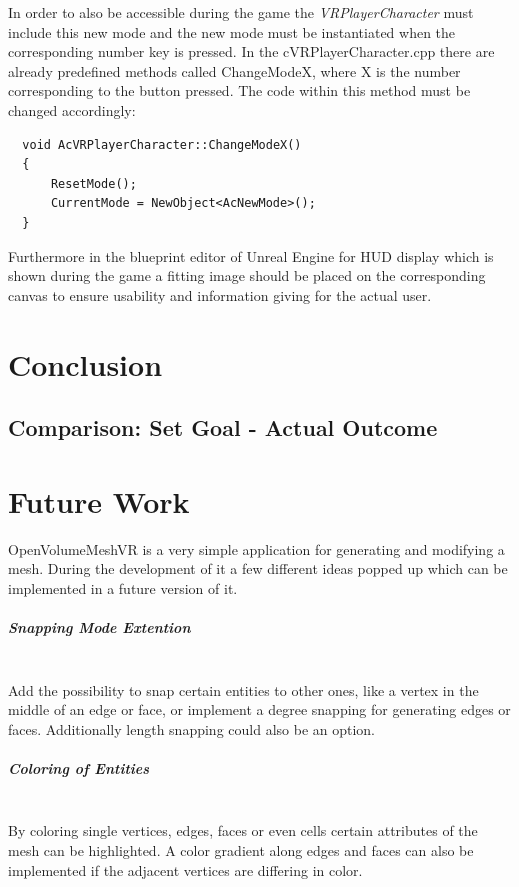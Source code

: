 \documentclass{report}
\begin{document}
		In order to also be accessible during the game the \textit{VRPlayerCharacter} must include this new mode and the new mode must be instantiated when the corresponding number key is pressed. In the cVRPlayerCharacter.cpp there are already predefined methods called ChangeModeX, where X is the number corresponding to the button pressed. The code within this method must be changed accordingly:
		\begin{verbatim}
  void AcVRPlayerCharacter::ChangeModeX()
  {
      ResetMode();
      CurrentMode = NewObject<AcNewMode>();
  }	
		\end{verbatim}
		Furthermore in the blueprint editor of Unreal Engine for HUD display which is shown during the game a fitting image should be placed on the corresponding canvas to ensure usability and information giving for the actual user.
	\closesection
	
	
\chapter{Conclusion}
	
	
	\section{Comparison: Set Goal - Actual Outcome}
	\startsection
	\closesection


\chapter{Future Work}
	OpenVolumeMeshVR is a very simple application for generating and modifying a mesh. During the development of it a few different ideas popped up which can be implemented in a future version of it.
	\paragraph{Snapping Mode Extention} \hfill \\
	Add the possibility to snap certain entities to other ones, like a vertex in the middle of an edge or face, or implement a degree snapping for generating edges or faces. Additionally length snapping could also be an option.
	\paragraph{Coloring of Entities} \hfill \\
	By coloring single vertices, edges, faces or even cells certain attributes of the mesh can be highlighted. A color gradient along edges and faces can also be implemented if the adjacent vertices are differing in color.
\end{document}
